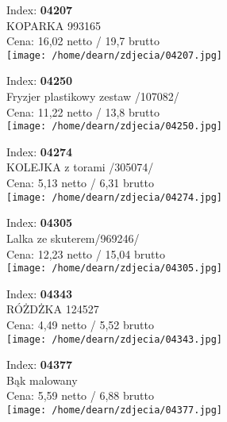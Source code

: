 {Index: \textbf{04207}\\
KOPARKA                                         993165\\
Cena: 16,02 netto / 19,7 brutto\\
  \texttt{[image: /home/dearn/zdjecia/04207.jpg]}}\newline\newline

{Index: \textbf{04250}\\
Fryzjer plastikowy zestaw /107082/\\
Cena: 11,22 netto / 13,8 brutto\\
  \texttt{[image: /home/dearn/zdjecia/04250.jpg]}}\newline\newline

{Index: \textbf{04274}\\
KOLEJKA z torami /305074/\\
Cena: 5,13 netto / 6,31 brutto\\
  \texttt{[image: /home/dearn/zdjecia/04274.jpg]}}\newline\newline

{Index: \textbf{04305}\\
Lalka ze skuterem/969246/\\
Cena: 12,23 netto / 15,04 brutto\\
  \texttt{[image: /home/dearn/zdjecia/04305.jpg]}}\newline\newline

{Index: \textbf{04343}\\
RÓŻDŻKA                                         124527\\
Cena: 4,49 netto / 5,52 brutto\\
  \texttt{[image: /home/dearn/zdjecia/04343.jpg]}}\newline\newline

{Index: \textbf{04377}\\
Bąk malowany\\
Cena: 5,59 netto / 6,88 brutto\\
  \texttt{[image: /home/dearn/zdjecia/04377.jpg]}}\newline\newline

